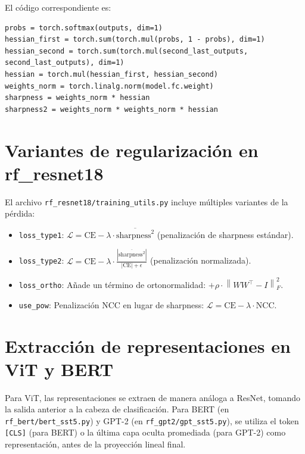 \documentclass[12pt,a4paper]{report}
\newcommand{\norm}[1]{\left\lVert#1\right\rVert}
\newcommand{\abs}[1]{\left\lvert#1\right\rvert}
\newcommand{\NCC}{\text{NCC}}
\newcommand{\CE}{\text{CE}}
\begin{document}
El código correspondiente es:

\begin{lstlisting}
probs = torch.softmax(outputs, dim=1)
hessian_first = torch.sum(torch.mul(probs, 1 - probs), dim=1)
hessian_second = torch.sum(torch.mul(second_last_outputs, second_last_outputs), dim=1)
hessian = torch.mul(hessian_first, hessian_second)
weights_norm = torch.linalg.norm(model.fc.weight)
sharpness = weights_norm * hessian
sharpness2 = weights_norm * weights_norm * hessian
\end{lstlisting}

\section{Variantes de regularización en rf\_resnet18}

El archivo \texttt{rf\_resnet18/training\_utils.py} incluye múltiples variantes de la pérdida:

\begin{itemize}
    \item \texttt{loss\_type1}: $\mathcal{L} = \CE - \lambda \cdot \overline{\text{sharpness}^2}$ (penalización de sharpness estándar).
    \item \texttt{loss\_type2}: $\mathcal{L} = \CE - \lambda \cdot \frac{\abs{\overline{\text{sharpness}^2}}}{\abs{\CE} + \epsilon}$ (penalización normalizada).
    \item \texttt{loss\_ortho}: Añade un término de ortonormalidad: $+\rho \cdot \norm{WW^\top - I}_F^2$.
    \item \texttt{use\_pow}: Penalización NCC en lugar de sharpness: $\mathcal{L} = \CE - \lambda \cdot \NCC$.
\end{itemize}

\section{Extracción de representaciones en ViT y BERT}

Para ViT, las representaciones se extraen de manera análoga a ResNet, tomando la salida anterior a la cabeza de clasificación. Para BERT (en \texttt{rf\_bert/bert\_sst5.py}) y GPT-2 (en \texttt{rf\_gpt2/gpt\_sst5.py}), se utiliza el token \texttt{[CLS]} (para BERT) o la última capa oculta promediada (para GPT-2) como representación, antes de la proyección lineal final.



\end{document}
